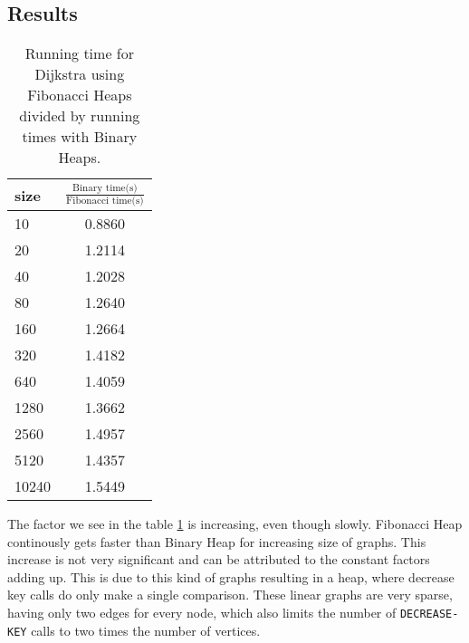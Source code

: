 \documentclass[a4paper,10pt]{article}
\begin{document}
\subsection{Results}
\begin{table}
  \begin{center}
    \begin{tabular}{l|c}
      size & $\frac{\text{Binary time(s)}}{\text{Fibonacci time(s)}}$ \\
      \hline
      10    & 0.8860\\
      20    & 1.2114\\
      40    & 1.2028\\
      80    & 1.2640\\
      160   & 1.2664\\
      320   & 1.4182\\
      640   & 1.4059\\
      1280  & 1.3662\\
      2560  & 1.4957\\
      5120  & 1.4357\\
      10240 & 1.5449
    \end{tabular}
    \caption{Running time for Dijkstra using Fibonacci Heaps divided by running times with Binary Heaps.}
    \label{inc-fac-bin-run-div-fib-run}
  \end{center}
\end{table}
The factor we see in the table \ref{inc-fac-bin-run-div-fib-run} is increasing, even though slowly. Fibonacci Heap continously gets faster than Binary Heap for increasing size of graphs. This increase is not very significant and can be attributed to the constant factors adding up. This is due to this kind of graphs resulting in a heap, where decrease key calls do only make a single comparison. These linear graphs are very sparse, having only two edges for every node, which also limits the number of \texttt{DECREASE\--KEY} calls to two times the number of vertices.
\end{document}
